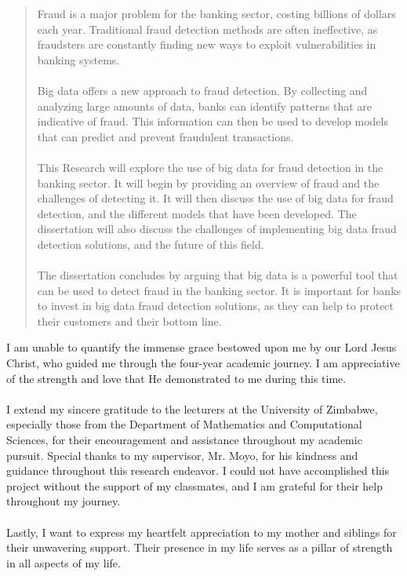 \documentclass[12pt, glossary]{dalthesis}
\theoremstyle{plain}
\numberwithin{equation}{chapter}
\begin{document}
\begin{abstract}
Fraud is a major problem for the banking sector, costing billions of dollars each year. Traditional fraud detection methods are often ineffective, as fraudsters are constantly finding new ways to exploit vulnerabilities in banking systems.\\\\
Big data offers a new approach to fraud detection. By collecting and analyzing large amounts of data, banks can identify patterns that are indicative of fraud. This information can then be used to develop models that can predict and prevent fraudulent transactions.\\\\
This Research will explore the use of big data for fraud detection in the banking sector. It will begin by providing an overview of fraud and the challenges of detecting it. It will then discuss the use of big data for fraud detection, and the different models that have been developed. The dissertation will also discuss the challenges of implementing big data fraud detection solutions, and the future of this field.\\\\
The dissertation concludes by arguing that big data is a powerful tool that can be used to detect fraud in the banking sector. It is important for banks to invest in big data fraud detection solutions, as they can help to protect their customers and their bottom line.
\end{abstract}



\printglossary


\begin{acknowledgements}


I am unable to quantify the immense grace bestowed upon me by our Lord Jesus Christ, who guided me through the four-year academic journey. I am appreciative of the strength and love that He demonstrated to me during this time.\\ \\
I extend my sincere gratitude to the lecturers at the University of Zimbabwe, especially those from the Department of Mathematics and Computational Sciences, for their encouragement and assistance throughout my academic pursuit. Special thanks to my supervisor, Mr. Moyo, for his kindness and guidance throughout this research endeavor. I could not have accomplished this project without the support of my classmates, and I am grateful for their help throughout my journey.\\ \\
Lastly, I want to express my heartfelt appreciation to my mother and siblings for their unwavering support. Their presence in my life serves as a pillar of strength in all aspects of my life.


\end{acknowledgements}
\end{document}
